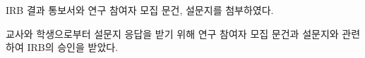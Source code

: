 IRB 결과 통보서와 연구 참여자 모집 문건, 설문지를 첨부하였다.

교사와 학생으로부터 설문지 응답을 받기 위해 연구 참여자 모집 문건과 설문지와 관련하여 IRB의 승인을 받았다.


%
%